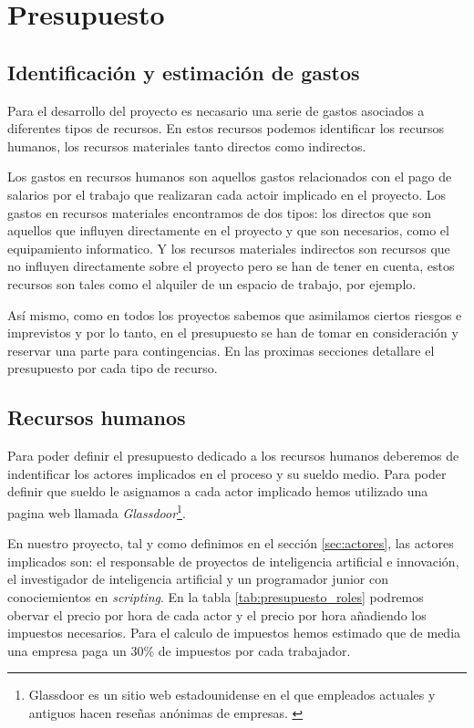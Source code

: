 \chapter{Presupuesto}
\label{cap:presupuesto}

\section{Identificación y estimación de gastos}
\label{sec:identificacion_gastos}

Para el desarrollo del proyecto es necasario una serie de gastos asociados a diferentes tipos de recursos. En estos recursos podemos identificar los 
recursos humanos, los recursos materiales tanto directos como indirectos.

Los gastos en recursos humanos son aquellos gastos relacionados con el pago de salarios por el trabajo que realizaran cada actoir implicado en el proyecto. 
Los gastos en recursos materiales encontramos de dos tipos: los directos que son aquellos que influyen directamente en el proyecto y que son necesarios, como
el equipamiento informatico. Y los recursos materiales indirectos son recursos que no influyen directamente sobre el proyecto pero se han de tener en cuenta,
estos recursos son tales como el alquiler de un espacio de trabajo, por ejemplo.

Así mismo, como en todos los proyectos sabemos que asimilamos ciertos riesgos e imprevistos y por lo tanto, en el presupuesto se han de tomar en consideración y
reservar una parte para contingencias. En las proximas secciones detallare el presupuesto por cada tipo de recurso.

\section{Recursos humanos}
\label{sec:recursos_humanos}

Para poder definir el presupuesto dedicado a los recursos humanos deberemos de indentificar los actores implicados en el proceso y su sueldo medio. Para poder definir que sueldo
le asignamos a cada actor implicado hemos utilizado una pagina web llamada \textit{Glassdoor}\footnote{Glassdoor es un sitio web estadounidense en el que empleados actuales y 
antiguos hacen reseñas anónimas de empresas. \cite{Glassdoor}}.

En nuestro proyecto, tal y como definimos en el sección \ref{sec:actores}, las actores implicados son: el responsable de proyectos de inteligencia artificial e innovación,
el investigador de inteligencia artificial y un programador junior con conociemientos en \textit{scripting}. En la tabla \ref{tab:presupuesto_roles} podremos obervar el precio 
por hora de cada actor y el precio por hora añadiendo los impuestos necesarios. Para el calculo de impuestos hemos estimado que de media una empresa paga un 30\% de impuestos por 
cada trabajador.

